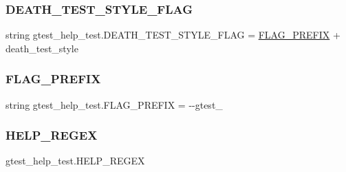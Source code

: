 \subsubsection{\texorpdfstring{DEATH\_TEST\_STYLE\_FLAG}{DEATH\_TEST\_STYLE\_FLAG}}
{\footnotesize\ttfamily string gtest\+\_\+help\+\_\+test.\+D\+E\+A\+T\+H\+\_\+\+T\+E\+S\+T\+\_\+\+S\+T\+Y\+L\+E\+\_\+\+F\+L\+AG = \mbox{\hyperlink{namespacegtest__help__test_a9e357a76dd993057c826ec411c9a4b3c}{F\+L\+A\+G\+\_\+\+P\+R\+E\+F\+IX}} + \textquotesingle{}death\+\_\+test\+\_\+style\textquotesingle{}}

\mbox{\label{namespacegtest__help__test_a9e357a76dd993057c826ec411c9a4b3c}} 
\subsubsection{\texorpdfstring{FLAG\_PREFIX}{FLAG\_PREFIX}}
{\footnotesize\ttfamily string gtest\+\_\+help\+\_\+test.\+F\+L\+A\+G\+\_\+\+P\+R\+E\+F\+IX = \textquotesingle{}-\/-\/gtest\+\_\+\textquotesingle{}}

\mbox{\label{namespacegtest__help__test_acaee97106f5b6ad6de66778688d4b906}} 
\subsubsection{\texorpdfstring{HELP\_REGEX}{HELP\_REGEX}}
{\footnotesize\ttfamily gtest\+\_\+help\+\_\+test.\+H\+E\+L\+P\+\_\+\+R\+E\+G\+EX}

